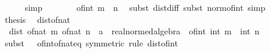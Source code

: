 \begin{isabellebody}
\ \ \ \ \isamarkupfalse%
\ simp\isanewline
\ \ \isamarkupfalse%
\ \isamarkupfalse%
\ {\isachardoublequoteopen}{\isasymdots}\ {\isacharequal}{\kern0pt}\ of{\isacharunderscore}{\kern0pt}int\ {\isasymbar}m\ {\isacharminus}{\kern0pt}\ n{\isasymbar}{\isachardoublequoteclose}\ \isamarkupfalse%
\ {\isacharparenleft}{\kern0pt}subst\ dist{\isacharunderscore}{\kern0pt}diff{\isacharcomma}{\kern0pt}\ subst\ norm{\isacharunderscore}{\kern0pt}of{\isacharunderscore}{\kern0pt}int{\isacharparenright}{\kern0pt}\ simp\isanewline
\ \ \isamarkupfalse%
\ \isamarkupfalse%
\ {\isacharquery}{\kern0pt}thesis\ \isacommand{{\isachardot}{\kern0pt}}\isamarkupfalse%
\isanewline
{}\isamarkupfalse%
%
\endisatagproof
{\isafoldproof}%
%
\isadelimproof
\isanewline
%
\endisadelimproof
\isanewline
{}\isamarkupfalse%
\ dist{\isacharunderscore}{\kern0pt}of{\isacharunderscore}{\kern0pt}nat{\isacharcolon}{\kern0pt}\isanewline
\ \ {\isachardoublequoteopen}dist\ {\isacharparenleft}{\kern0pt}of{\isacharunderscore}{\kern0pt}nat\ m{\isacharparenright}{\kern0pt}\ {\isacharparenleft}{\kern0pt}of{\isacharunderscore}{\kern0pt}nat\ n\ {\isacharcolon}{\kern0pt}{\isacharcolon}{\kern0pt}\ {\isacharprime}{\kern0pt}a\ {\isacharcolon}{\kern0pt}{\isacharcolon}{\kern0pt}\ real{\isacharunderscore}{\kern0pt}normed{\isacharunderscore}{\kern0pt}algebra{\isacharunderscore}{\kern0pt}{}{\isacharparenright}{\kern0pt}\ {\isacharequal}{\kern0pt}\ of{\isacharunderscore}{\kern0pt}int\ {\isasymbar}int\ m\ {\isacharminus}{\kern0pt}\ int\ n{\isasymbar}{\isachardoublequoteclose}\isanewline
%
\isadelimproof
\ \ %
\endisadelimproof
%
\isatagproof
{}\isamarkupfalse%
\ {\isacharparenleft}{\kern0pt}subst\ {\isacharparenleft}{\kern0pt}{}\ {}{\isacharparenright}{\kern0pt}\ of{\isacharunderscore}{\kern0pt}int{\isacharunderscore}{\kern0pt}of{\isacharunderscore}{\kern0pt}nat{\isacharunderscore}{\kern0pt}eq\ {\isacharbrackleft}{\kern0pt}symmetric{\isacharbrackright}{\kern0pt}{\isacharparenright}{\kern0pt}\ {\isacharparenleft}{\kern0pt}rule\ dist{\isacharunderscore}{\kern0pt}of{\isacharunderscore}{\kern0pt}int{\isacharparenright}{\kern0pt}%
\endisatagproof
{\isafoldproof}%
%
\isadelimproof
%
\endisadelimproof
%
\isadelimdocument
%
\endisadelimdocument
%
\isatagdocument
%
\isamarkuptrue%
%
\endisatagdocument
{\isafolddocument}%
%
\isadelimdocument
%
\endisadelimdocument
{}\isamarkupfalse%

\end{isabellebody}
